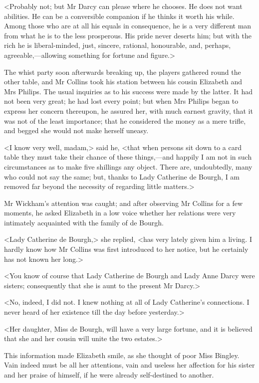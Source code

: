 <Probably not; but Mr Darcy can please where he chooses. He does not want abilities. He can be a conversible companion if he thinks it worth his while. Among those who are at all his equals in consequence, he is a very different man from what he is to the less prosperous. His pride never deserts him; but with the rich he is liberal-minded, just, sincere, rational, honourable, and, perhaps, agreeable,—allowing something for fortune and figure.>

The whist party soon afterwards breaking up, the players gathered round the other table, and Mr Collins took his station between his cousin Elizabeth and Mrs Philips. The usual inquiries as to his success were made by the latter. It had not been very great; he had lost every point; but when Mrs Philips began to express her concern thereupon, he assured her, with much earnest gravity, that it was not of the least importance; that he considered the money as a mere trifle, and begged she would not make herself uneasy.

<I know very well, madam,> said he, <that when persons sit down to a card table they must take their chance of these things,—and happily I am not in such circumstances as to make five shillings any object. There are, undoubtedly, many who could not say the same; but, thanks to Lady Catherine de Bourgh, I am removed far beyond the necessity of regarding little matters.>

Mr Wickham's attention was caught; and after observing Mr Collins for a few moments, he asked Elizabeth in a low voice whether her relations were very intimately acquainted with the family of de Bourgh.

<Lady Catherine de Bourgh,> she replied, <has very lately given him a living. I hardly know how Mr Collins was first introduced to her notice, but he certainly has not known her long.>

<You know of course that Lady Catherine de Bourgh and Lady Anne Darcy were sisters; consequently that she is aunt to the present Mr Darcy.>

<No, indeed, I did not. I knew nothing at all of Lady Catherine's connections. I never heard of her existence till the day before yesterday.>

<Her daughter, Miss de Bourgh, will have a very large fortune, and it is believed that she and her cousin will unite the two estates.>

This information made Elizabeth smile, as she thought of poor Miss Bingley. Vain indeed must be all her attentions, vain and useless her affection for his sister and her praise of himself, if he were already self-destined to another.

